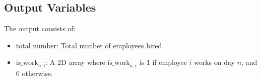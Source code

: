 \documentclass{article}
\begin{document}
\subsection*{Output Variables}
The output consists of:
\begin{itemize}
    \item \( \text{total\_number} \): Total number of employees hired.
    \item \( \text{is\_work}_{n,i} \): A 2D array where \( \text{is\_work}_{n,i} \) is 1 if employee \( i \) works on day \( n \), and 0 otherwise.
\end{itemize}
\end{document}

